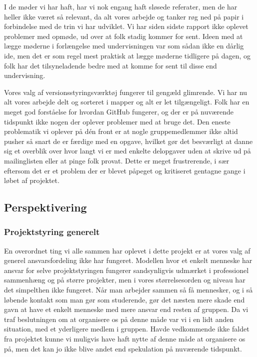 \documentclass[10pt,a4paper,danish]{article}
\begin{document}
I de møder vi har haft, har vi nok engang haft sløsede referater, men de har
heller ikke været så relevant, da alt vores arbejde og tanker røg ned på papir
i forbindelse med de trin vi har udviklet. Vi har
siden sidste rapport ikke oplevet problemer med opmøde, ud over at folk stadig
kommer for sent. Ideen med at lægge møderne i forlængelse med undervisningen
var som sådan ikke en dårlig ide, men det er som regel mest praktisk at lægge
møderne tidligere på dagen, og folk har det tilsyneladende bedre med at komme
for sent til disse end undervisning. 

Vores valg af versionsstyringsværktøj fungerer til gengæld glimrende. Vi har nu alt vores
arbejde delt og sorteret i mapper og alt er let tilgængeligt. Folk har en meget
god forståelse for hvordan GitHub fungerer, og der er på nuværende tidspunkt ikke
nogen der oplever problemer med at bruge det. Den eneste problematik vi oplever 
på dén front er at nogle gruppemedlemmer ikke altid pusher så snart de er færdige 
med en opgave, hvilket gør det besværligt at danne sig et overblik over hvor langt 
vi er med enkelte delopgaver uden at skrive ud på mailinglisten eller at pinge folk
provat. Dette er meget frustrerende, i sær eftersom det er et problem der er blevet
påpeget og kritiseret gentagne gange i løbet af projektet. 

\subsection{Perspektivering}
\subsubsection{Projektstyring generelt}
En overordnet ting vi alle sammen har oplevet i dette projekt er at vores valg
af generel ansvarsfordeling ikke har fungeret. Modellen hvor et enkelt menneske
har ansvar for selve projektstyringen fungerer sandsynligvis udmærket i professionel
sammenhæng og på større projekter, men i vores størrelsesorden og niveau har det
simpelthen ikke fungeret. Når man arbejder sammen så få mennesker, og i så løbende 
kontakt som man gør som studerende, gør det næsten mere skade end gavn at have et 
enkelt menneske med mere ansvar end resten af gruppen. Da vi traf beslutningen om 
at organisere os på denne måde var vi i en lidt anden situation, med et yderligere 
medlem i gruppen. Havde vedkommende ikke faldet fra projektet kunne vi muligvis
have haft nytte af denne måde at organisere os på, men det kan jo ikke blive andet
end spekulation på nuværende tidspunkt. 
\end{document}

